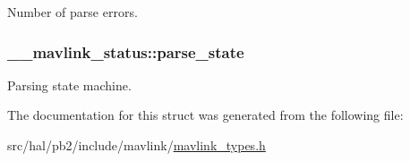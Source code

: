 Number of parse errors. 

\subsubsection[{\texorpdfstring{parse\+\_\+state}{parse_state}}]{ \+\_\+\+\_\+mavlink\+\_\+status\+::parse\+\_\+state}\hypertarget{struct____mavlink__status_aaf6742a61bbc641a4600184b3260fa0f}{}\label{struct____mavlink__status_aaf6742a61bbc641a4600184b3260fa0f}


Parsing state machine. 



The documentation for this struct was generated from the following file\+:\begin{DoxyCompactItemize}
\item 
src/hal/pb2/include/mavlink/\hyperlink{mavlink__types_8h}{mavlink\+\_\+types.\+h}\end{DoxyCompactItemize}
